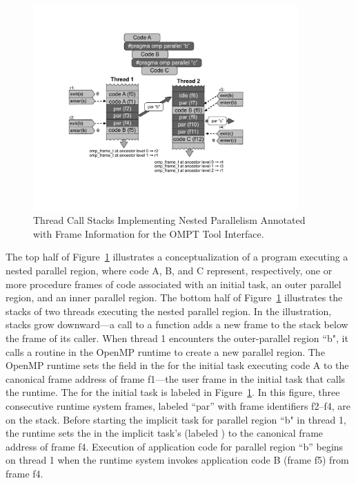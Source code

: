    \begin{figure}[h]
    \centering
        \includegraphics[width=4in]{appendices/callstack-cropped.pdf}
    \caption{Thread Call Stacks Implementing Nested Parallelism
      Annotated with Frame Information for the OMPT Tool Interface.\label{fig:frame}}
\end{figure}

The top half of Figure~\ref{fig:frame} illustrates a
conceptualization of a program executing a nested
parallel region, where code A, B, and C represent, respectively, one
or more procedure frames of code
associated with an initial task, an outer parallel region, and an inner parallel
region. The bottom half of Figure~\ref{fig:frame} illustrates the stacks of two
threads executing the nested parallel region.
In the illustration, stacks grow downward---a call to a function adds
a new frame to the stack below the frame of its caller.
When thread 1 encounters the outer-parallel
region ``b", it calls a routine in the OpenMP runtime to
create a new parallel region. The OpenMP runtime sets the
 field in the  for the initial
task executing code A to the canonical frame address of frame f1---the user frame in the initial task
that calls the runtime. The  for the initial task
is labeled  in Figure~\ref{fig:frame}. In this figure, three
consecutive runtime system frames, labeled ``par'' with frame
identifiers f2--f4, are on the stack.  Before starting the implicit
task for parallel region ``b" in thread 1, the runtime sets the
 in the implicit task's  (labeled
) to the canonical frame address of frame f4. Execution of application code for parallel region
``b'' begins on thread 1 when the runtime system invokes application
code B (frame f5) from frame f4.

